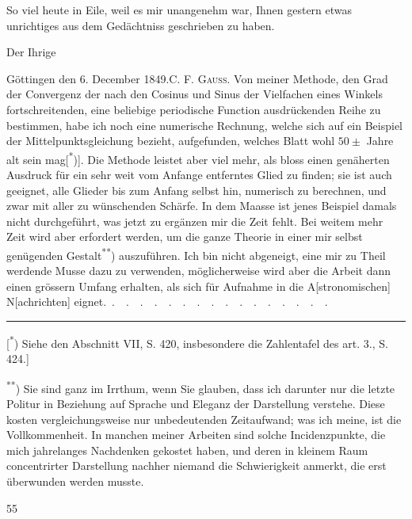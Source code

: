 \indent So viel heute in Eile, weil es mir unangenehm war, Ihnen gestern etwas unrichtiges aus dem Gedächtniss geschrieben zu haben.
\begin{flushright}Der Ihrige\hspace*{.15\linewidth}\end{flushright}
\noindent\hspace*{\parindent}Göttingen den 6. December 1849.\hfill C. F. \textsc{Gauss}.
\indent Von meiner Methode, den Grad der Convergenz der nach den Cosinus und Sinus der Vielfachen eines Winkels fortschreitenden, eine beliebige periodische Function ausdrückenden Reihe zu bestimmen, habe ich noch eine numerische Rechnung, welche sich auf ein Beispiel der Mittelpunktsgleichung bezieht, aufgefunden, welches Blatt wohl \(50\pm\) Jahre alt sein mag[\textsuperscript{*})]. Die Methode leistet aber viel mehr, als bloss einen genäherten Ausdruck für ein sehr weit vom Anfange entferntes Glied zu finden; sie ist auch geeignet, alle Glieder bis zum Anfang selbst hin, numerisch zu berechnen, und zwar mit aller zu wünschenden Schärfe. In dem Maasse ist jenes Beispiel damals nicht durchgeführt, was jetzt zu ergänzen mir die Zeit fehlt. Bei weitem mehr Zeit wird aber erfordert werden, um die ganze Theorie in einer mir selbst genügenden Gestalt\textsuperscript{**}) auszuführen. Ich bin nicht abgeneigt, eine mir zu Theil werdende Musse dazu zu verwenden, möglicherweise wird aber die Arbeit dann einen grössern Umfang erhalten, als sich für Aufnahme in die A[stronomischen] N[achrichten] eignet. \(\,{.}\quad{.}\quad{.}\quad{.}\quad{.}\quad{.}\quad{.}\quad{.}\quad{.}\quad{.}\quad{.}\quad{.}\quad{.}\quad{.}\quad{.}\quad{.}\)
\par\medskip\noindent\rule{.24\linewidth}{.4pt}\par\smallskip
{\small\noindent\hspace*{\parindent}[\textsuperscript{*}) Siehe den Abschnitt VII, S. 420, insbesondere die Zahlentafel des art. 3., S. 424.]\par}
\noindent\hspace*{\parindent}\textsuperscript{**}) Sie sind ganz im Irrthum, wenn Sie glauben, dass ich darunter nur die letzte Politur in Beziehung auf Sprache und Eleganz der Darstellung verstehe. Diese kosten vergleichungsweise nur unbedeutenden Zeitaufwand; was ich meine, ist die  Vollkommenheit. In manchen meiner Arbeiten sind solche Incidenzpunkte, die mich jahrelanges Nachdenken gekostet haben, und deren in kleinem Raum concentrirter Darstellung nachher niemand die Schwierigkeit anmerkt, die erst überwunden werden musste.
\par\smallskip{}\hfill{\small 55}
